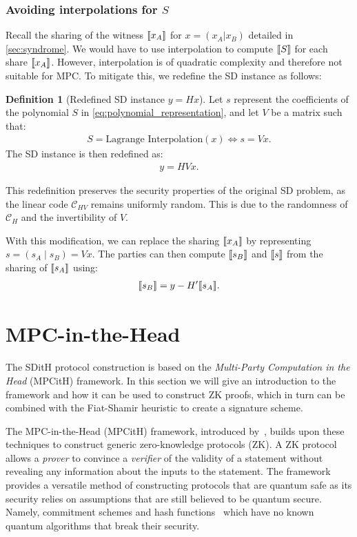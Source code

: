 \documentclass[11pt]{report}
\theoremstyle{definition}
\newtheorem{definition}{Definition}[section]
\theoremstyle{plain}
\begin{document}
\subsubsection{Avoiding interpolations for $S$}\label{sec:syndrome-avoid-interpolation}
Recall the sharing of the witness $\llbracket x_A \rrbracket$ for $x = (x_A | x_B)$ detailed in \autoref{sec:syndrome}. We would have to use interpolation to compute $\llbracket S \rrbracket$ for each share $\llbracket x_A \rrbracket$. However, interpolation is of quadratic complexity and therefore not suitable for MPC. To mitigate this, we redefine the SD instance as follows:

\begin{definition}[Redefined SD instance $y = Hx$]
  Let $s$ represent the coefficients of the polynomial $S$ in \autoref{eq:polynomial_representation}, and let $V$ be a matrix such that:
  \begin{align*}
    S = \text{Lagrange Interpolation}(x) \Leftrightarrow s = Vx.
  \end{align*}
  The SD instance is then redefined as:
  \begin{align*}
    y = HVx.
  \end{align*}
\end{definition}

This redefinition preserves the security properties of the original SD problem, as the linear code $\mathcal{C}_{HV}$ remains uniformly random. This is due to the randomness of $\mathcal{C}_H$ and the invertibility of $V$.

With this modification, we can replace the sharing $\llbracket x_A \rrbracket$ by representing $s = (s_A \mid s_B) = Vx$. The parties can then compute $\llbracket s_B \rrbracket$ and $\llbracket s \rrbracket$ from the sharing of $\llbracket s_A \rrbracket$ using:
\begin{align*}
  \llbracket s_B \rrbracket = y - H'\llbracket s_A \rrbracket.
\end{align*}

\section{MPC-in-the-Head}\label{sec:mpcinth}

The SDitH protocol construction is based on the \textit{Multi-Party Computation in the Head} (MPCitH) framework. In this section we will give an introduction to the framework and how it can be used to construct ZK proofs, which in turn can be combined with the Fiat-Shamir heuristic to create a signature scheme.

The MPC-in-the-Head (MPCitH) framework, introduced by~\cite{ishai2007zero}, builds upon these techniques to construct generic zero-knowledge protocols (ZK). A ZK protocol allows a \textit{prover} to convince a \textit{verifier} of the validity of a statement without revealing any information about the inputs to the statement. The framework provides a versatile method of constructing protocols that are quantum safe as its security relies on assumptions that are still believed to be quantum secure. Namely, commitment schemes and hash functions~\cite{feneuil2023threshold} which have no known quantum algorithms that break their security.
\end{document}
